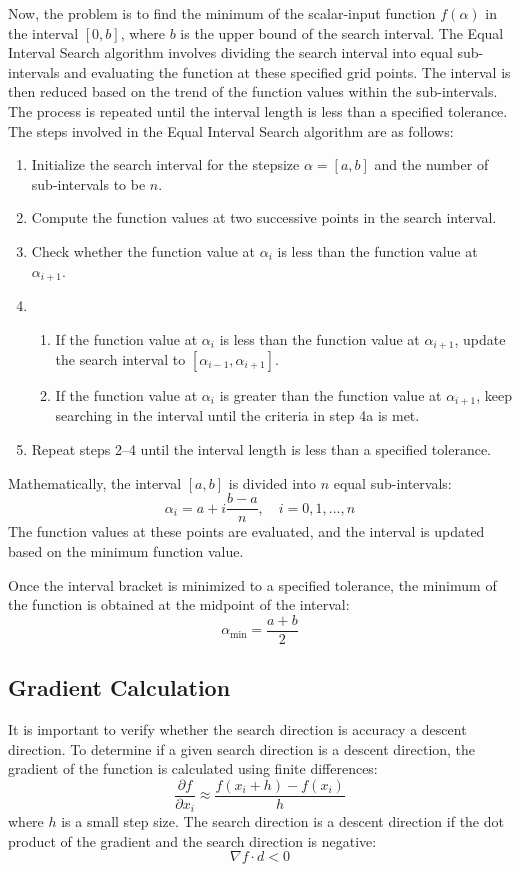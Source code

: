 \documentclass[11pt,a4paper]{article}
\begin{document}
Now, the problem is to find the minimum of the scalar-input function \(f(\alpha)\) in the interval \([0, b]\), where \(b\) is the upper bound of the search interval. The Equal Interval Search algorithm involves dividing the search interval into equal sub-intervals and evaluating the function at these specified grid points. The interval is then reduced based on the trend of the function values within the sub-intervals. The process is repeated until the interval length is less than a specified tolerance. The steps involved in the Equal Interval Search algorithm are as follows:

\begin{enumerate}
    \item Initialize the search interval for the stepsize \(\alpha = [a, b]\) and the number of sub-intervals to be \(n\).
    \item Compute the function values at two successive points in the search interval.
    \item Check whether the function value at \(\alpha_i\) is less than the function value at \(\alpha_{i+1}\).
    \item \begin{enumerate}
        \item If the function value at \(\alpha_i\) is less than the function value at \(\alpha_{i+1}\), update the search interval to \([\alpha_{i-1}, \alpha_{i+1}]\).
        \item If the function value at \(\alpha_i\) is greater than the function value at \(\alpha_{i+1}\), keep searching in the interval until the criteria in step 4a is met.
    \end{enumerate}
    \item Repeat steps 2–4 until the interval length is less than a specified tolerance.
\end{enumerate}

Mathematically, the interval \([a, b]\) is divided into \(n\) equal sub-intervals:
\[
\alpha_i = a + i \frac{b - a}{n}, \quad i = 0, 1, \ldots, n
\]
The function values at these points are evaluated, and the interval is updated based on the minimum function value.

Once the interval bracket is minimized to a specified tolerance, the minimum of the function is obtained at the midpoint of the interval:
\[
\alpha_{\text{min}} = \frac{a + b}{2}
\]

\subsection{Gradient Calculation}
It is important to verify whether the search direction is accuracy a descent direction. To determine if a given search direction is a descent direction, the gradient of the function is calculated using finite differences:
\[
\frac{\partial f}{\partial x_i} \approx \frac{f(x_i + h) - f(x_i)}{h}
\]
where \(h\) is a small step size. The search direction is a descent direction if the dot product of the gradient and the search direction is negative:
\[
\nabla f \cdot d < 0
\]
\end{document}
